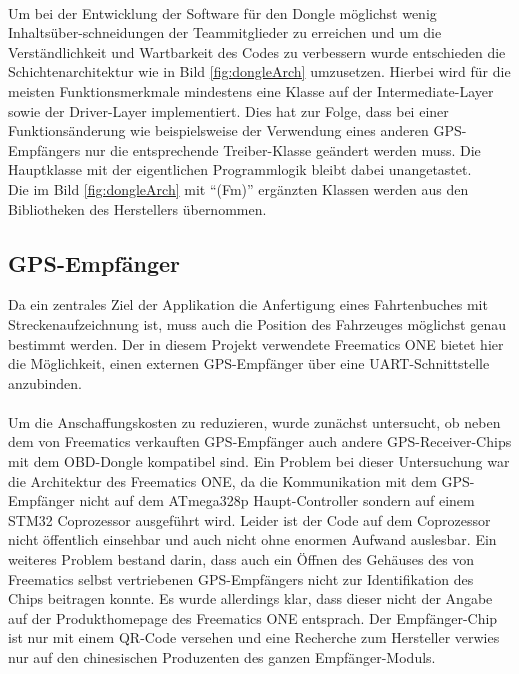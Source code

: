 \paragraph{}
Um bei der Entwicklung der Software für den Dongle möglichst wenig Inhaltsüber-schneidungen der Teammitglieder zu erreichen und um die Verständlichkeit und Wartbarkeit des Codes zu verbessern wurde entschieden die Schichtenarchitektur wie in Bild \ref{fig:dongleArch} umzusetzen.
Hierbei wird für die meisten Funktionsmerkmale mindestens eine Klasse auf der Intermediate-Layer sowie der Driver-Layer implementiert. Dies hat zur Folge, dass bei einer Funktionsänderung wie beispielsweise der Verwendung eines anderen GPS-Empfängers nur die entsprechende Treiber-Klasse geändert werden muss. Die Hauptklasse mit der eigentlichen Programmlogik bleibt dabei unangetastet.\\
Die im Bild \ref{fig:dongleArch} mit \enquote{(Fm)} ergänzten Klassen werden aus den Bibliotheken des Herstellers übernommen.
\subsection{GPS-Empfänger}
Da ein zentrales Ziel der Applikation die Anfertigung eines Fahrtenbuches mit Streckenaufzeichnung ist, muss auch die Position des Fahrzeuges möglichst genau bestimmt werden. Der in diesem Projekt verwendete Freematics ONE bietet hier die Möglichkeit, einen externen GPS-Empfänger über eine \ac{UART}-Schnittstelle anzubinden.
\paragraph{}
Um die Anschaffungskosten zu reduzieren, wurde zunächst untersucht, ob neben dem von Freematics verkauften GPS-Empfänger auch andere GPS-Receiver-Chips mit dem OBD-Dongle kompatibel sind.
Ein Problem bei dieser Untersuchung war die Architektur des Freematics ONE, da die Kommunikation mit dem GPS-Empfänger nicht auf dem ATmega328p Haupt-Controller sondern auf einem STM32 Coprozessor ausgeführt wird. Leider ist der Code auf dem Coprozessor nicht öffentlich einsehbar und auch nicht ohne enormen Aufwand auslesbar.
Ein weiteres Problem bestand darin, dass auch ein Öffnen des Gehäuses des von Freematics selbst vertriebenen GPS-Empfängers nicht zur Identifikation des Chips beitragen konnte. Es wurde allerdings klar, dass dieser nicht der Angabe auf der Produkthomepage des Freematics ONE entsprach. Der Empfänger-Chip ist nur mit einem QR-Code versehen und eine Recherche zum Hersteller verwies nur auf den chinesischen Produzenten des ganzen Empfänger-Moduls\cite{Co.2014}.
